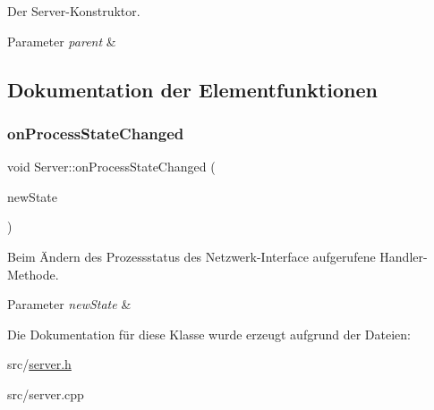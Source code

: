 Der Server-\/\+Konstruktor. 


\begin{DoxyParams}{Parameter}
{\em parent} & \\
\hline
\end{DoxyParams}


\subsection{Dokumentation der Elementfunktionen}
\hypertarget{class_server_a08efa8bc9e0445b13be2af5b6a3037b2}{}\label{class_server_a08efa8bc9e0445b13be2af5b6a3037b2} 
\subsubsection{\texorpdfstring{on\+Process\+State\+Changed}{onProcessStateChanged}}
{\footnotesize\ttfamily void Server\+::on\+Process\+State\+Changed (\begin{DoxyParamCaption}\item[{const Q\+Process\+::\+Process\+State \&}]{new\+State }\end{DoxyParamCaption})\hspace{0.3cm}{\ttfamily [slot]}}



Beim Ändern des Prozessstatus des Netzwerk-\/\+Interface aufgerufene Handler-\/\+Methode. 


\begin{DoxyParams}{Parameter}
{\em new\+State} & \\
\hline
\end{DoxyParams}


Die Dokumentation für diese Klasse wurde erzeugt aufgrund der Dateien\+:\begin{DoxyCompactItemize}
\item 
src/\hyperlink{server_8h}{server.\+h}\item 
src/server.\+cpp\end{DoxyCompactItemize}
